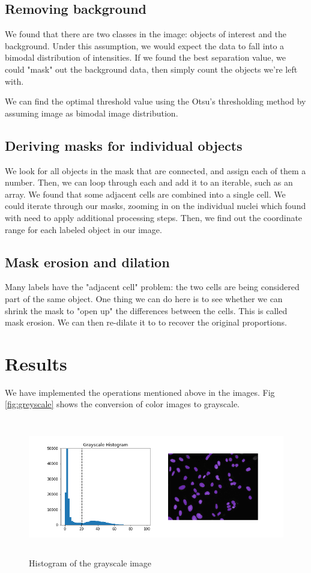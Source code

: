 \documentclass[letterpaper, 10 pt, conference]{ieeeconf}
\begin{document}
 \subsection{Removing background}
We found that there are two classes in the image: objects of interest and the background. Under this assumption, we would expect the data to fall into a bimodal distribution of intensities. If we found the best separation value, we could "mask" out the background data, then simply count the objects we're left with.

We can find the optimal threshold value using the Otsu's thresholding method by assuming image as bimodal image distribution.

\subsection{Deriving masks for individual objects}
We look for all objects in the mask that are connected, and assign each of them a number. Then, we can loop through each and add it to an iterable, such as an array.
We found that some adjacent cells are combined into a single cell. We could iterate through our masks, zooming in on the individual nuclei which found with need to apply additional processing steps.  Then, we find out the coordinate range for each labeled object in our image.

\subsection{Mask erosion and dilation}
 Many labels have the "adjacent cell" problem: the two cells are being considered part of the same object. One thing we can do here is to see whether we can shrink the mask to "open up" the differences between the cells. This is called mask erosion. We can then re-dilate it to to recover the original proportions.


\section{Results}
We have implemented the operations mentioned above in the images. Fig \ref{fig:greyscale} shows the conversion of color images to grayscale. 


\begin{figure}
\centering
\includegraphics[height=6cm, width=1.145\linewidth]{hist.png}
\caption{Histogram of the grayscale image}
\label{fig:hist}
\end{figure}
\end{document}
